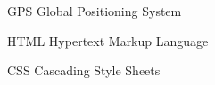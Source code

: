 \begin{siglas}
  \item[GPS] Global Positioning System
  \item[HTML] Hypertext Markup Language
  \item[CSS] Cascading Style Sheets
\end{siglas}
